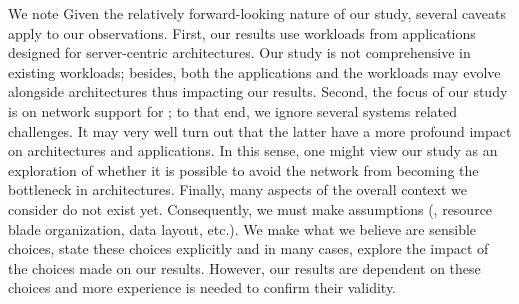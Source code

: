 \noindent
We note 
Given the relatively forward-looking nature of our study, several caveats apply to our observations. 
First, our results use workloads from applications designed for server-centric architectures. Our study is not comprehensive in existing workloads; besides, both the applications and the workloads may evolve alongside \dis architectures thus impacting  our results. Second, the focus of our study is on network support for \dis; to that end, we ignore several systems related challenges. It may very well turn out that the latter have a more profound impact on \dis architectures and applications. In this sense, one might view our study as an exploration of whether it is possible to avoid the network from becoming the bottleneck in \dis architectures. Finally, many aspects of the overall \dis context we consider do not exist yet. Consequently, we must make assumptions (\eg, resource blade organization, data layout, etc.). We make what we believe are sensible choices, state these choices explicitly and in many cases, explore the impact of the choices made on our results. However, our results are dependent on these choices and more experience is needed to confirm their validity.

